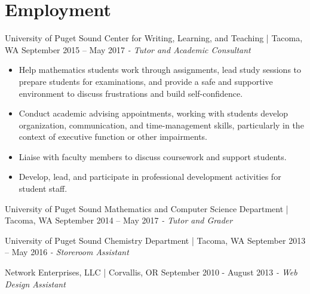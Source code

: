 \section{Employment}
University of Puget Sound Center for Writing, Learning, and Teaching | Tacoma, WA \hfill September 2015 – May 2017 \newline
\textit{ - Tutor and Academic Consultant}  \\
 \vspace{-4.5mm}
 \begin{itemize}
 \item Help mathematics students work through assignments, lead study sessions to prepare students for examinations, and provide a safe and supportive environment to discuss frustrations and build self-confidence.
 \item Conduct academic advising appointments, working with students develop organization, communication, and time-management skills, particularly in the context of executive function or other impairments.
 \item Liaise with faculty members to discuss coursework and support students.
 \item Develop, lead, and participate in professional development activities for student staff.
 \end{itemize}
\vspace{-3.5mm}
University of Puget Sound Mathematics and Computer Science Department | Tacoma, WA \hfill  September 2014 – May 2017 \newline
\textit{- Tutor and Grader} \\
  \vspace{-4.5mm}
    \vspace{-3.5mm}

University of Puget Sound Chemistry Department | Tacoma, WA \hfill September 2013 – May 2016 \newline
\textit{- Storeroom Assistant} \\
  \vspace{-4.5mm}
    \vspace{-3.5mm}

Network Enterprises, LLC | Corvallis, OR \hfill September 2010 - August 2013 \newline
\textit{- Web Design Assistant} \hfill
    \vspace{-3.5mm}
